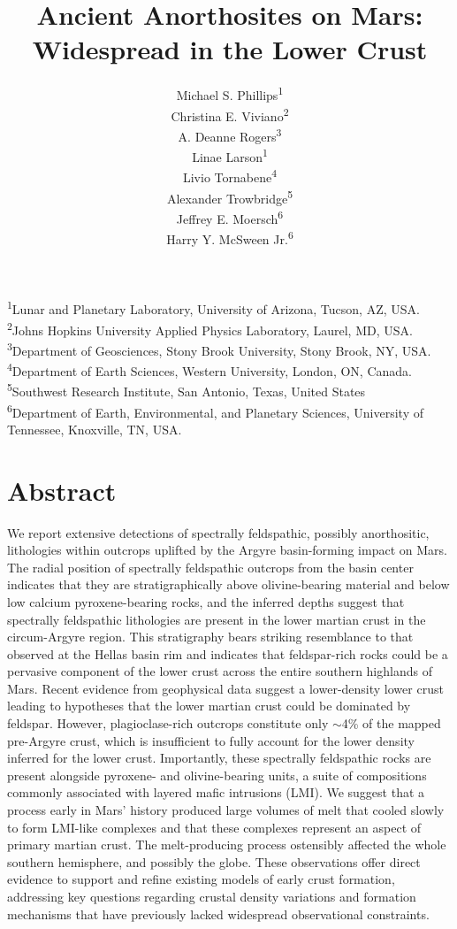 \documentclass[12pt]{article}
\title{\textbf{Ancient Anorthosites on Mars: Widespread in the Lower Crust}}
\author{Michael S. Phillips\textsuperscript{1}\\ 
Christina E. Viviano\textsuperscript{2}\\
A. Deanne Rogers\textsuperscript{3}\\
Linae Larson\textsuperscript{1}\\
Livio Tornabene\textsuperscript{4}\\
Alexander Trowbridge\textsuperscript{5}\\
Jeffrey E. Moersch\textsuperscript{6}\\
Harry Y. McSween Jr.\textsuperscript{6}}
\begin{document}
\maketitle

\begin{flushleft}
\textsuperscript{1}Lunar and Planetary Laboratory, University of Arizona, Tucson, AZ, USA.\\
\textsuperscript{2}Johns Hopkins University Applied Physics Laboratory, Laurel, MD, USA.\\
\textsuperscript{3}Department of Geosciences, Stony Brook University, Stony Brook, NY, USA.\\
\textsuperscript{4}Department of Earth Sciences, Western University, London, ON, Canada.\\
\textsuperscript{5}Southwest Research Institute, San Antonio, Texas, United States\\
\textsuperscript{6}Department of Earth, Environmental, and Planetary Sciences, University of Tennessee, Knoxville, TN, USA.\\
\end{flushleft}

\newpage
\section*{Abstract}
\linenumbers
\setlength{\parindent}{0em} %
\setlength{\parskip}{6pt}   %
We report extensive detections of spectrally feldspathic, possibly anorthositic, lithologies within outcrops uplifted by the Argyre basin-forming impact on Mars. The radial position of spectrally feldspathic outcrops from the basin center indicates that they are stratigraphically above olivine-bearing material and below low calcium pyroxene-bearing rocks, and the inferred depths suggest that spectrally feldspathic lithologies are present in the lower martian crust in the circum-Argyre region. This stratigraphy bears striking resemblance to that observed at the Hellas basin rim and indicates that feldspar-rich rocks could be a pervasive component of the lower crust across the entire southern highlands of Mars. Recent evidence from geophysical data suggest a lower-density lower crust leading to hypotheses that the lower martian crust could be dominated by feldspar. However, plagioclase-rich outcrops constitute only $\sim$4\% of the mapped pre-Argyre crust, which is insufficient to fully account for the lower density inferred for the lower crust. Importantly, these spectrally feldspathic rocks are present alongside pyroxene- and olivine-bearing units, a suite of compositions commonly associated with layered mafic intrusions (LMI). We suggest that a process early in Mars' history produced large volumes of melt that cooled slowly to form LMI-like complexes and that these complexes represent an aspect of primary martian crust. The melt-producing process ostensibly affected the whole southern hemisphere, and possibly the globe. These observations offer direct evidence to support and refine existing models of early crust formation, addressing key questions regarding crustal density variations and formation mechanisms that have previously lacked widespread observational constraints.
\end{document}
